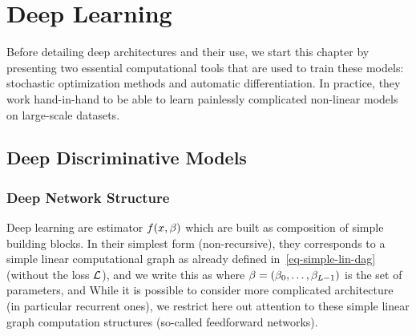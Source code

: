 
\chapter{Deep Learning}
\label{c-deep-learning}



Before detailing deep architectures and their use, we start this chapter by presenting two essential computational tools that are used to train these models: stochastic optimization methods and automatic differentiation. In practice, they work hand-in-hand to be able to learn painlessly complicated non-linear models on large-scale datasets. 



%

\section{Deep Discriminative Models}
\label{sec-deepnet-discr}

\subsection{Deep Network Structure}
\label{sec-deep-structure}

Deep learning are estimator $f(x,\beta)$ which are built as composition of simple building blocks.
%
In their simplest form (non-recursive), they corresponds to a simple linear computational graph as already defined in~\eqref{eq-simple-lin-dag} (without the loss $\mathcal{L}$), and we write this as
where $\beta=(\beta_0,\ldots,\beta_{L-1})$ is the set of parameters, and 
%
While it is possible to consider more complicated architecture (in particular recurrent ones), we restrict here out attention to these simple linear graph computation structures (so-called feedforward networks).

